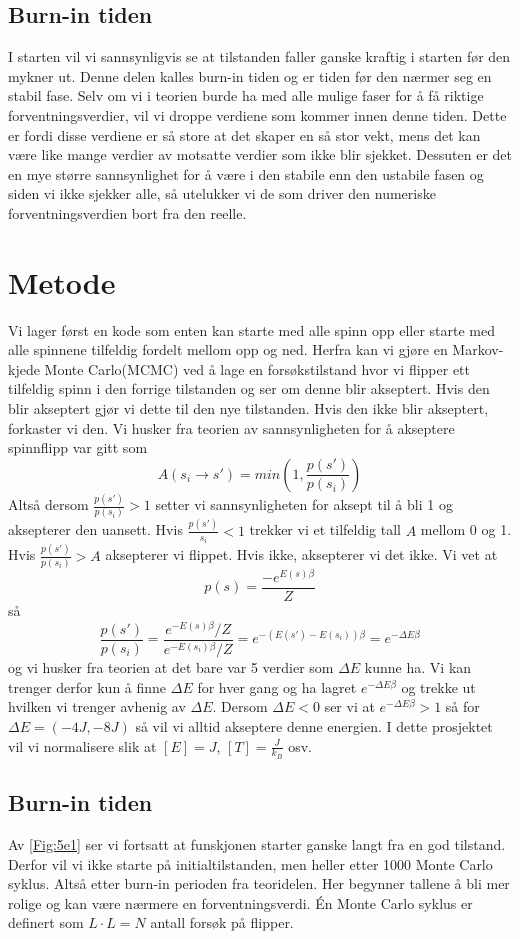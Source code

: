 \documentclass[reprint,english,notitlepage]{revtex4-2}  %
\begin{document}
\subsection{Burn-in tiden}
I starten vil vi sannsynligvis se at tilstanden faller ganske kraftig i starten før den mykner ut. Denne delen kalles burn-in tiden og er tiden før den nærmer seg en stabil fase. Selv om vi i teorien burde ha med alle mulige faser for å få riktige forventningsverdier, vil vi droppe verdiene som kommer innen denne tiden. Dette er fordi disse verdiene er så store at det skaper en så stor vekt, mens det kan være like mange verdier av motsatte verdier som ikke blir sjekket. Dessuten er det en mye større sannsynlighet for å være i den stabile enn den ustabile fasen og siden vi ikke sjekker alle, så utelukker vi de som driver den numeriske forventningsverdien bort fra den reelle.
\section{Metode}
Vi lager først en kode som enten kan starte med alle spinn opp eller starte med alle spinnene tilfeldig fordelt mellom opp og ned. Herfra kan vi gjøre en Markov-kjede Monte Carlo(MCMC) ved å lage en forsøkstilstand hvor vi flipper ett tilfeldig spinn i den forrige tilstanden og ser om denne blir akseptert. Hvis den blir akseptert gjør vi dette til den nye tilstanden. Hvis den ikke blir akseptert, forkaster vi den. Vi husker fra teorien av sannsynligheten for å akseptere spinnflipp var gitt som
$$
A(s_i\rightarrow s')=min(1, \frac{p(s')}{p(s_i)})
$$
Altså dersom $\frac{p(s')}{p(s_i)}>1$ setter vi sannsynligheten for aksept til å bli 1 og aksepterer den uansett. Hvis $\frac{p(s')}{s_i}<1$ trekker vi et tilfeldig tall $A$ mellom 0 og 1. Hvis $\frac{p(s')}{p(s_i)}>A$ aksepterer vi flippet. Hvis ikke, aksepterer vi det ikke. Vi vet at
$$
p(s)=\frac{-e^{E(s)\beta}}{Z}
$$
så
$$
\frac{p(s')}{p(s_i)}=\frac{e^{-E(s)\beta}/Z}{e^{-E(s_i)\beta}/Z}=e^{-(E(s')-E(s_i))\beta}=e^{-\Delta E \beta}
$$
og vi husker fra teorien at det bare var 5 verdier som $\Delta E$ kunne ha. Vi kan trenger derfor kun å finne $\Delta E$ for hver gang og ha lagret $e^{-\Delta E \beta}$ og trekke ut hvilken vi trenger avhenig av $\Delta E$. Dersom $\Delta E<0$ ser vi at $e^{-\Delta E \beta}>1$ så for $\Delta E=(-4J, -8J)$ så vil vi alltid akseptere denne energien. I dette prosjektet vil vi normalisere slik at $[E]=J$, $[T]=\frac{J}{k_B}$ osv.
\subsection{Burn-in tiden}
Av \autoref{Fig:5e1} ser vi fortsatt at funskjonen starter ganske langt fra en god tilstand. Derfor vil vi ikke starte på initialtilstanden, men heller etter 1000 Monte Carlo syklus. Altså etter burn-in perioden fra teoridelen. Her begynner tallene å bli mer rolige og kan være nærmere en forventningsverdi. Én Monte Carlo syklus er definert som $L\cdot L=N$ antall forsøk på flipper.
\end{document}
